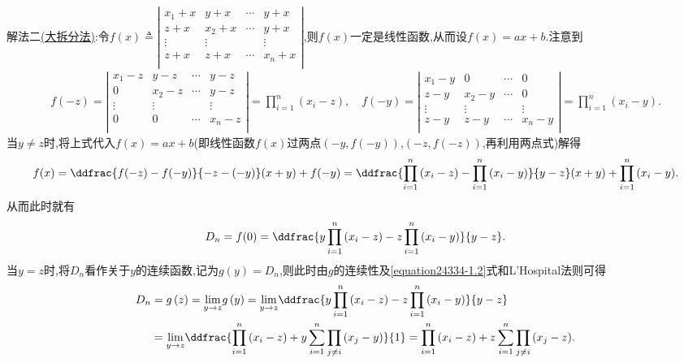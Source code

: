 \documentclass[../../main.tex]{subfiles}
\begin{document}
\begin{solution}
{\color{blue}解法二\hyperref[大拆分法]{(大拆分法)}:}令$f(x) \triangleq \left| \begin{matrix}
x_1+x & y+x & \cdots & y+x \\
z+x & x_2+x & \cdots & y+x \\
\vdots & \vdots & & \vdots \\
z+x & z+x & \cdots & x_n+x \\
\end{matrix} \right|$,则$f(x)$一定是线性函数,从而设$f(x) =ax+b$.注意到
\begin{align*}
f(-z) =\left| \begin{matrix}
x_1-z & y-z & \cdots & y-z \\
0 & x_2-z & \cdots & y-z \\
\vdots & \vdots & & \vdots \\
0 & 0 & \cdots & x_n-z \\
\end{matrix} \right|=\prod_{i=1}^n{(x_i-z)},\quad f(-y) =\left| \begin{matrix}
x_1-y & 0 & \cdots & 0 \\
z-y & x_2-y & \cdots & 0 \\
\vdots & \vdots & & \vdots \\
z-y & z-y & \cdots & x_n-y \\
\end{matrix} \right|=\prod_{i=1}^n{(x_i-y)}.
\end{align*}
当$y\ne z$时,将上式代入$f(x) =ax+b$(即线性函数$f(x)$过两点$(-y,f(-y))$,$(-z,f(-z))$,再利用两点式)解得
\begin{align*}
f(x) =\ddfrac{f(-z) -f(-y)}{-z-(-y)}(x+y) +f(-y) =\ddfrac{\prod_{i=1}^n{(x_i-z)}-\prod_{i=1}^n{(x_i-y)}}{y-z}(x+y) +\prod_{i=1}^n{(x_i-y)}.
\end{align*}
从而此时就有
\begin{align}
D_n=f(0) =\ddfrac{y\prod_{i=1}^n{(x_i}-z)-z\prod_{i=1}^n{(x_i}-y)}{y-z}.\label{equation24334-1.2}
\end{align}
当$y=z$时,将$D_n$看作关于$y$的连续函数,记为$g(y) =D_n$,则此时由$g$的连续性及\eqref{equation24334-1.2}式和L'Hospital法则可得
\begin{align*}
D_n&=g\left( z \right) =\underset{y\rightarrow z}{\lim}g\left( y \right) =\underset{y\rightarrow z}{\lim}\ddfrac{y\prod_{i=1}^n{(x_i}-z)-z\prod_{i=1}^n{(x_i}-y)}{y-z}
\\
&=\underset{y\rightarrow z}{\lim}\ddfrac{\prod_{i=1}^n{(x_i}-z)+y\sum_{i=1}^n{\prod_{j\ne i}{(x_j}}-y)}{1}=\prod_{i=1}^n{(x_i}-z)+z\sum_{i=1}^n{\prod_{j\ne i}{(x_j}}-z).
\end{align*}

\end{solution}
\end{document}
